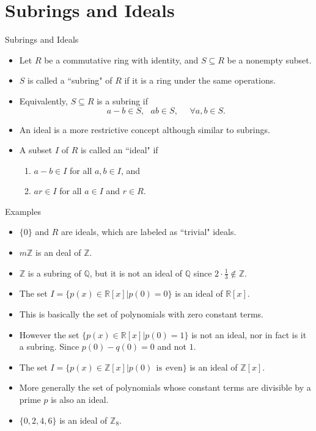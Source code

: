 \documentclass[ %
 10pt, xcolor={dvipsnames,svgnames,x11names,hyperref},
   hyperref={colorlinks=true,citecolor=green,linkcolor=DarkRed,urlcolor=ProcessBlue,anchorcolor=blue}
  ]{beamer}
\newenvironment{stepitemize}{\begin{itemize}[<+->]}{\end{itemize} }
\newcommand{\Z}{\mathbb{Z}}
\newcommand{\Q}{\mathbb{Q}}
\newcommand{\R}{\mathbb{R}}
\begin{document}
\section{Subrings and Ideals}
\begin{frame}{Subrings and Ideals}
\begin{stepitemize}
\item Let $R$ be a commutative ring with identity, and $S\subseteq R$ be a nonempty subset.
\item $S$ is called a ``subring" of $R$ if it is a ring under the same operations.
\item Equivalently, $S\subseteq R$ is a subring if
$$a-b\in S, \:\:\: ab\in S, \:\:\:\:\:\:\forall a,b\in S.$$
\item An ideal is a more restrictive concept although similar to subrings.
\item A subset $I$ of $R$ is called an ``ideal" if
\begin{enumerate}
    \item $a-b\in I$ for all $a,b \in I$, and
    \item $ar \in I$ for all $a \in I$ and $r \in R$.
\end{enumerate}
\end{stepitemize}
\end{frame}

\begin{frame}{Examples}
    \begin{stepitemize}
    \item $\{0\}$ and $R$ are ideals, which are labeled as ``trivial" ideals.
    \item $m\Z$ is an deal of $\Z$.
    \item $\Z$ is a subring of $\Q$, but it is not an ideal of $\Q$ since $2\cdot \frac{1}{3} \not \in \Z$.
    \item The set $I = \{p(x) \in \R[x]|p(0)=0\}$ is an ideal of $\R[x]$.
    \item This is basically the set of polynomials with zero constant terms.
    \item However the set $\{p(x)\in \R[x]|p(0)=1\}$ is not an ideal, nor in fact is it a subring. Since $p(0)-q(0)=0$ and not $1$.
    \item The set $I = \{p(x) \in \Z[x] | p(0) \:\:\textrm{is} \:\:\textrm{even}\}$ is an ideal of $\Z[x]$.
    \item More generally the set of polynomials whose constant terms are divisible by a prime $p$ is also an ideal.
    \item $\{0,2,4,6\}$ is an ideal of $\Z_8$.
    \end{stepitemize}
\end{frame}
\end{document}
